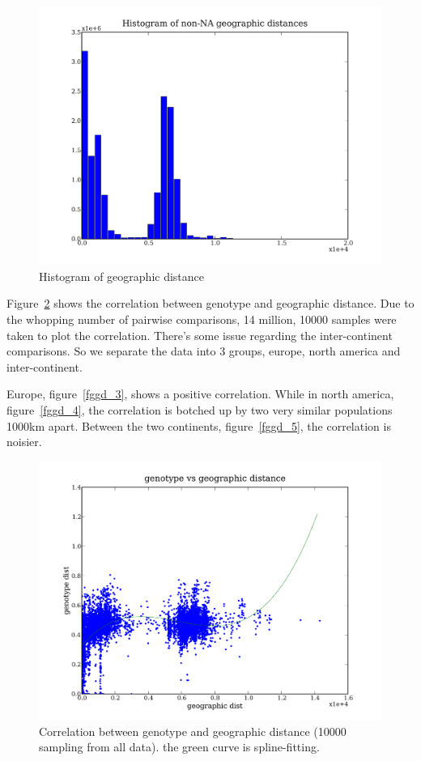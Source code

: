 \documentclass[a4paper,10pt]{article}
\begin{document}
\begin{figure}
\includegraphics[width=1\textwidth]{figures/data_d110_c0_5_geo_distance_hist.png}
\caption{Histogram of geographic distance}\label{fggd_1}
\end{figure}

Figure~\ref{fggd_2} shows the correlation between genotype and geographic distance. Due to the whopping number of pairwise comparisons, 14 million, 10000 samples were taken to plot the correlation. There's some issue regarding the inter-continent comparisons. So we separate the data into 3 groups, europe, north america and inter-continent.

Europe, figure~\ref{fggd_3}, shows a positive correlation. While in north america, figure~\ref{fggd_4}, the correlation is botched up by two very similar populations 1000km apart. Between the two continents, figure~\ref{fggd_5}, the correlation is noisier.

\begin{figure}
\includegraphics[width=1\textwidth]{figures/data_d110_c0_5_geno_vs_geo_dist.png}
\caption{Correlation between genotype and geographic distance (10000 sampling from all data). the green curve is spline-fitting.}\label{fggd_2}
\end{figure}
\end{document}
